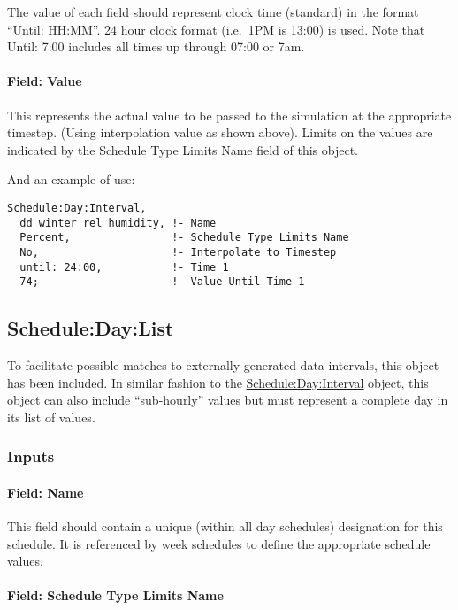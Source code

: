 The value of each field should represent clock time (standard) in the format ``Until: HH:MM''. 24 hour clock format (i.e.~1PM is 13:00) is used. Note that Until: 7:00 includes all times up through 07:00 or 7am.

\paragraph{Field: Value}\label{field-value}

This represents the actual value to be passed to the simulation at the appropriate timestep. (Using interpolation value as shown above). Limits on the values are indicated by the Schedule Type Limits Name field of this object.

And an example of use:

\begin{lstlisting}
Schedule:Day:Interval,
  dd winter rel humidity, !- Name
  Percent,                !- Schedule Type Limits Name
  No,                     !- Interpolate to Timestep
  until: 24:00,           !- Time 1
  74;                     !- Value Until Time 1
\end{lstlisting}

\subsection{Schedule:Day:List}\label{scheduledaylist}

To facilitate possible matches to externally generated data intervals, this object has been included. In similar fashion to the \hyperref[scheduledayinterval]{Schedule:Day:Interval} object, this object can also include ``sub-hourly'' values but must represent a complete day in its list of values.

\subsubsection{Inputs}\label{inputs-3-032}

\paragraph{Field: Name}\label{field-name-3-028}

This field should contain a unique (within all day schedules) designation for this schedule. It is referenced by week schedules to define the appropriate schedule values.

\paragraph{Field: Schedule Type Limits Name}\label{field-schedule-type-limits-name-2-000}


